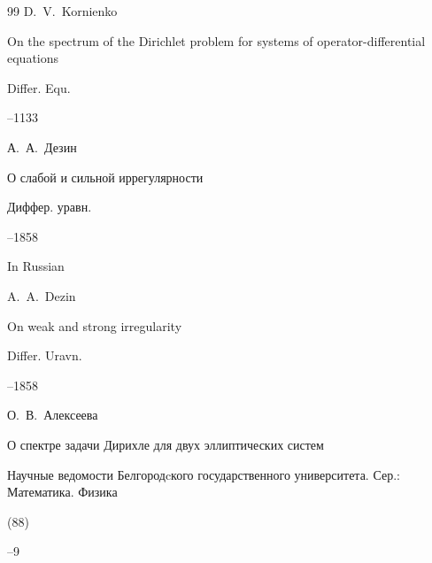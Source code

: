\begin{thebibliography}{99}
\by D.~V.~Kornienko

\paper On the spectrum of the Dirichlet problem for systems of operator-differential equations

\jour Differ. Equ.




--1133







\by А.~А.~Дезин

\paper О слабой и сильной иррегулярности

\jour Диффер. уравн.




--1858


\misctransl

\lang In Russian

\by A.~A.~Dezin

\paper On weak and strong irregularity

\jour Differ. Uravn.




–1858






\by О.~В.~Алексеева

\paper О спектре задачи Дирихле для двух эллиптических систем

\jour Научные ведомости Белгородcкого государственного университета. Сер.: Математика. Физика


(88)


--9


\end{thebibliography}
